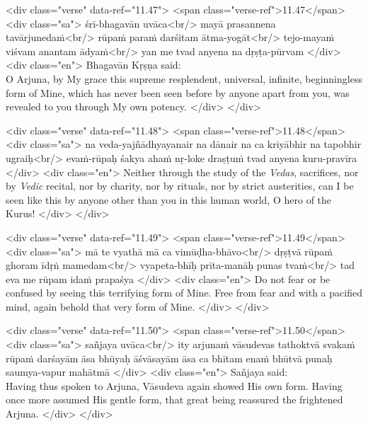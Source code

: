 \begin{html}
<div class="verse" data-ref="11.47">
  <span class="verse-ref">11.47</span>
  <div class="sa">
    śrī-bhagavān uvāca<br/>
    mayā prasannena tavārjunedaṁ<br/>
    rūpaṁ paraṁ darśitam ātma-yogāt<br/>
    tejo-mayaṁ viśvam anantam ādyaṁ<br/>
    yan me tvad anyena na dṛṣṭa-pūrvam
  </div>
  <div class="en">
    \hspace*{1em}Bhagavān Kṛṣṇa said: \\ O Arjuna, by My grace this supreme resplendent, universal, infinite, beginningless form of Mine, which has never been seen before by anyone apart from you, was revealed to you through My own potency.
  </div>
</div>
\end{html}



\begin{html}
<div class="verse" data-ref="11.48">
  <span class="verse-ref">11.48</span>
  <div class="sa">
    na veda-yajñādhyayanair na dānair na ca kriyābhir na tapobhir ugraiḥ<br/>
    evaṁ-rūpaḥ śakya ahaṁ nṛ-loke draṣṭuṁ tvad anyena kuru-pravīra
  </div>
  <div class="en">
    Neither through the study of the \textit{Vedas}, sacrifices, nor by \textit{Vedic} recital, nor by charity, nor by rituals, nor by strict austerities, can I be seen like this by anyone other than you in this human world, O hero of the Kurus!
  </div>
</div>
\end{html}



\begin{html}
<div class="verse" data-ref="11.49">
  <span class="verse-ref">11.49</span>
  <div class="sa">
    mā te vyathā mā ca vimūḍha-bhāvo<br/>
    dṛṣṭvā rūpaṁ ghoram īdṛṅ mamedam<br/>
    vyapeta-bhīḥ prīta-manāḥ punas tvaṁ<br/>
    tad eva me rūpam idaṁ prapaśya
  </div>
  <div class="en">
    Do not fear or be confused by seeing this terrifying form of Mine. Free from fear and with a pacified mind, again behold that very form of Mine.
  </div>
</div>
\end{html}



\begin{html}
<div class="verse" data-ref="11.50">
  <span class="verse-ref">11.50</span>
  <div class="sa">
    sañjaya uvāca<br/>
    ity arjunaṁ vāsudevas tathoktvā svakaṁ rūpaṁ darśayām āsa bhūyaḥ āśvāsayām āsa ca bhītam enaṁ bhūtvā punaḥ saumya-vapur mahātmā
  </div>
  <div class="en">
    \hspace*{1em}Sañjaya said: \\ Having thus spoken to Arjuna, Vāsudeva again showed His own form. Having once more assumed His gentle form, that great being reassured the frightened Arjuna.
  </div>
</div>
\end{html}



